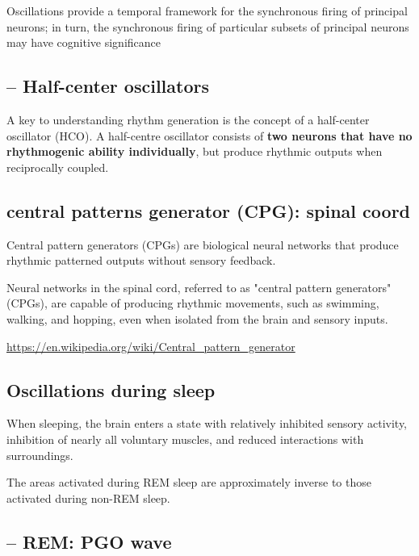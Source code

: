 Oscillations provide a temporal framework for the
synchronous firing of principal neurons; in turn, the synchronous
firing of particular subsets of principal neurons may have cognitive
significance


\subsection{-- Half-center oscillators}
\label{sec:half-center-oscillator}

A key to understanding rhythm generation is the concept of a half-center
oscillator (HCO). A half-centre oscillator consists of {\bf two neurons that
have no rhythmogenic ability individually}, but produce rhythmic outputs when
reciprocally coupled.

\subsection{central patterns generator (CPG): spinal coord}
\label{sec:central-patterns-generator}
\label{sec:CPG}

Central pattern generators (CPGs) are biological neural networks that produce
rhythmic patterned outputs without sensory feedback.

Neural networks in the spinal cord, referred to as "central pattern generators"
(CPGs), are capable of producing rhythmic movements, such as swimming, walking,
and hopping, even when isolated from the brain and sensory inputs.

\url{https://en.wikipedia.org/wiki/Central_pattern_generator}






\subsection{Oscillations during sleep}
\label{sec:sleep}


When sleeping, the brain enters a state with relatively
inhibited sensory activity, inhibition of nearly all voluntary muscles, and
reduced interactions with surroundings.

The areas activated during REM sleep are approximately inverse to those
activated during non-REM sleep.

\subsection{-- REM: PGO wave}
\label{sec:PGO-wave}

